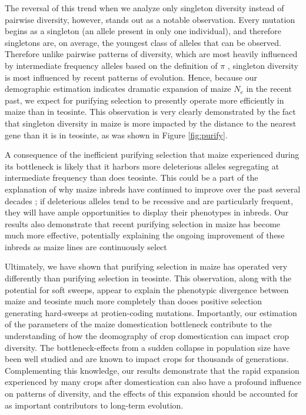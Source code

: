\documentclass{pnastwo}
\begin{document}
\begin{article}
The reversal of this trend when we analyze only singleton diversity instead of pairwise diversity, however, stands out as a notable observation. Every mutation begins as a singleton (an allele present in only one individual), and therefore singletons are, on average, the youngest class of alleles that can be observed. Therefore unlike pairwise patterns of diversity, which are most heavily influenced by intermediate frequency alleles based on the definition of $\pi$ \cite{nei1979}, singleton diversity is most influenced by recent patterns of evolution. Hence, because our demographic estimation indicates dramatic expansion of maize $N_e$ in the recent past, we expect for purifying selection to presently operate more efficiently in maize than in teosinte. This observation is very clearly demonstrated by the fact that singleton diversity in maize is more impacted by the distance to the nearest gene than it is in teosinte, as was shown in Figure \ref{fig:purify}.

A consequence of the inefficient purifying selection that maize experienced during its bottleneck is likely that it harbors more deleterious alleles segregating at intermediate frequency than does teosinte. This could be a part of the explanation of why maize inbreds have continued to improve over the past several decades \cite{meghji1984}; if deleterious alleles tend to be recessive and are particularly frequent, they will have ample opportunities to display their phenotypes in inbreds. Our results also demonstrate that recent purifying selection in maize has become much more effective, potentially explaining the ongoing improvement of these inbreds as maize lines are continuously select

Ultimately, we have shown that purifying selection in maize has operated very differently than purifying selection in teosinte. This observation, along with the potential for soft sweeps, appear to explain the phenotypic divergence between maize and teosinte much more completely than dooes positive selection generating hard-sweeps at protien-coding mutations. Importantly, our estimation of the parameters of the maize domestication bottleneck contribute to the understanding of how the deomography of crop domestication can impact crop diversity. The bottleneck-effects from a sudden collapse in population size have been well studied and are known to impact crops for thousands of generations. Complementing this knowledge, our results demonstrate that the rapid expansion experienced by many crops after domestication can also have a profound influence on patterns of diversity, and the effects of this expansion should be accounted for as important contributors to long-term evolution.


\end{article}
\end{document}
